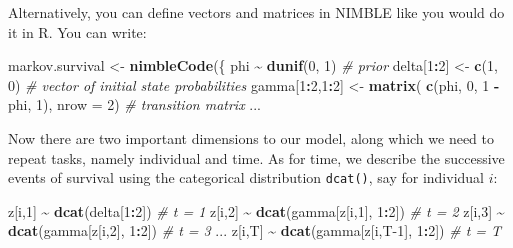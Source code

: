 \documentclass[
  12pt,
]{krantz}
\newenvironment{Shaded}{\begin{snugshade}}{\end{snugshade}}
\newcommand{\AttributeTok}[1]{\textcolor[rgb]{0.13,0.29,0.53}{#1}}
\newcommand{\CommentTok}[1]{\textcolor[rgb]{0.56,0.35,0.01}{\textit{#1}}}
\newcommand{\DecValTok}[1]{\textcolor[rgb]{0.00,0.00,0.81}{#1}}
\newcommand{\FunctionTok}[1]{\textcolor[rgb]{0.13,0.29,0.53}{\textbf{#1}}}
\newcommand{\NormalTok}[1]{#1}
\newcommand{\OtherTok}[1]{\textcolor[rgb]{0.56,0.35,0.01}{#1}}
\newcommand{\SpecialCharTok}[1]{\textcolor[rgb]{0.81,0.36,0.00}{\textbf{#1}}}
\begin{document}
Alternatively, you can define vectors and matrices in NIMBLE like you would do it in R. You can write:

\begin{Shaded}
\begin{Highlighting}[]
\NormalTok{markov.survival }\OtherTok{\textless{}{-}} \FunctionTok{nimbleCode}\NormalTok{(\{}
\NormalTok{  phi }\SpecialCharTok{\textasciitilde{}} \FunctionTok{dunif}\NormalTok{(}\DecValTok{0}\NormalTok{, }\DecValTok{1}\NormalTok{) }\CommentTok{\# prior}
\NormalTok{  delta[}\DecValTok{1}\SpecialCharTok{:}\DecValTok{2}\NormalTok{] }\OtherTok{\textless{}{-}} \FunctionTok{c}\NormalTok{(}\DecValTok{1}\NormalTok{, }\DecValTok{0}\NormalTok{) }\CommentTok{\# vector of initial state probabilities}
\NormalTok{  gamma[}\DecValTok{1}\SpecialCharTok{:}\DecValTok{2}\NormalTok{,}\DecValTok{1}\SpecialCharTok{:}\DecValTok{2}\NormalTok{] }\OtherTok{\textless{}{-}} \FunctionTok{matrix}\NormalTok{( }\FunctionTok{c}\NormalTok{(phi, }\DecValTok{0}\NormalTok{, }\DecValTok{1} \SpecialCharTok{{-}}\NormalTok{ phi, }\DecValTok{1}\NormalTok{), }\AttributeTok{nrow =} \DecValTok{2}\NormalTok{) }\CommentTok{\# transition matrix}
\NormalTok{...}
\end{Highlighting}
\end{Shaded}

Now there are two important dimensions to our model, along which we need to repeat tasks, namely individual and time. As for time, we describe the successive events of survival using the categorical distribution \texttt{dcat()}, say for individual \(i\):

\begin{Shaded}
\begin{Highlighting}[]
\NormalTok{z[i,}\DecValTok{1}\NormalTok{] }\SpecialCharTok{\textasciitilde{}} \FunctionTok{dcat}\NormalTok{(delta[}\DecValTok{1}\SpecialCharTok{:}\DecValTok{2}\NormalTok{])           }\CommentTok{\# t = 1}
\NormalTok{z[i,}\DecValTok{2}\NormalTok{] }\SpecialCharTok{\textasciitilde{}} \FunctionTok{dcat}\NormalTok{(gamma[z[i,}\DecValTok{1}\NormalTok{], }\DecValTok{1}\SpecialCharTok{:}\DecValTok{2}\NormalTok{])   }\CommentTok{\# t = 2}
\NormalTok{z[i,}\DecValTok{3}\NormalTok{] }\SpecialCharTok{\textasciitilde{}} \FunctionTok{dcat}\NormalTok{(gamma[z[i,}\DecValTok{2}\NormalTok{], }\DecValTok{1}\SpecialCharTok{:}\DecValTok{2}\NormalTok{])   }\CommentTok{\# t = 3}
\NormalTok{...}
\NormalTok{z[i,T] }\SpecialCharTok{\textasciitilde{}} \FunctionTok{dcat}\NormalTok{(gamma[z[i,T}\DecValTok{{-}1}\NormalTok{], }\DecValTok{1}\SpecialCharTok{:}\DecValTok{2}\NormalTok{]) }\CommentTok{\# t = T}
\end{Highlighting}
\end{Shaded}
\end{document}
